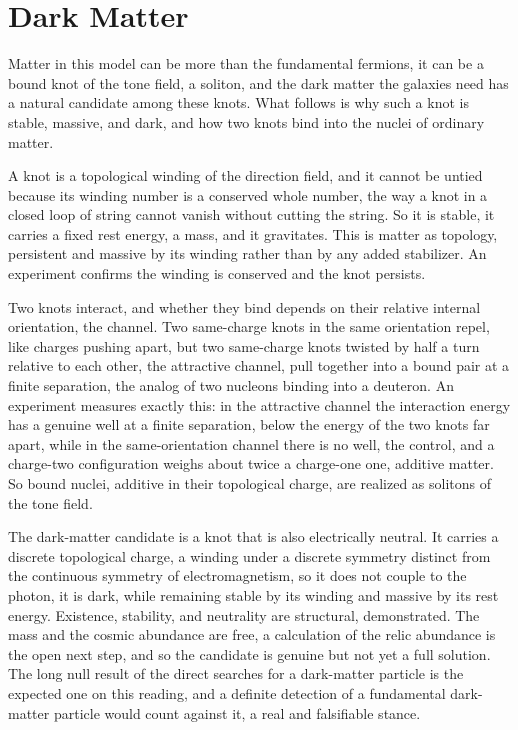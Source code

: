 \section{Dark Matter}

Matter in this model can be more than the fundamental fermions, it can be a bound knot of the tone field, a soliton, and
the dark matter the galaxies need has a natural candidate among these knots. What follows is why such a knot is stable,
massive, and dark, and how two knots bind into the nuclei of ordinary matter.

A knot is a topological winding of the direction field, and it cannot be untied because its winding number is a conserved
whole number, the way a knot in a closed loop of string cannot vanish without cutting the string. So it is stable, it
carries a fixed rest energy, a mass, and it gravitates. This is matter as topology, persistent and massive by its winding
rather than by any added stabilizer. An experiment confirms the winding is conserved and the knot persists.

Two knots interact, and whether they bind depends on their relative internal orientation, the channel. Two same-charge
knots in the same orientation repel, like charges pushing apart, but two same-charge knots twisted by half a turn
relative to each other, the attractive channel, pull together into a bound pair at a finite separation, the analog of two
nucleons binding into a deuteron. An experiment measures exactly this: in the attractive channel the interaction energy
has a genuine well at a finite separation, below the energy of the two knots far apart, while in the same-orientation
channel there is no well, the control, and a charge-two configuration weighs about twice a charge-one one, additive
matter. So bound nuclei, additive in their topological charge, are realized as solitons of the tone field.

The dark-matter candidate is a knot that is also electrically neutral. It carries a discrete topological charge, a
winding under a discrete symmetry distinct from the continuous symmetry of electromagnetism, so it does not couple to the
photon, it is dark, while remaining stable by its winding and massive by its rest energy. Existence, stability, and
neutrality are structural, demonstrated. The mass and the cosmic abundance are free, a calculation of the relic abundance
is the open next step, and so the candidate is genuine but not yet a full solution. The long null result of the direct
searches for a dark-matter particle is the expected one on this reading, and a definite detection of a fundamental
dark-matter particle would count against it, a real and falsifiable stance.

